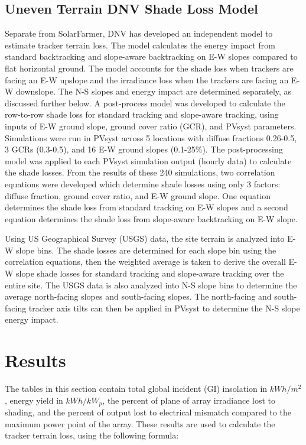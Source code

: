 \documentclass[conference]{IEEEtran}
\begin{document}
\subsection{Uneven Terrain DNV Shade Loss Model}
Separate from SolarFarmer, DNV has developed an independent model to estimate tracker terrain loss. The model calculates the energy impact from standard backtracking and slope-aware backtracking on E-W slopes compared to flat horizontal ground. The model accounts for the shade loss when trackers are facing an E-W upslope and the irradiance loss when the trackers are facing an E-W downslope. The N-S slopes and energy impact are determined separately, as discussed further below. A post-process model was developed to calculate the row-to-row shade loss for standard tracking and slope-aware tracking, using inputs of E-W ground slope, ground cover ratio (GCR), and PVsyst parameters. Simulations were run in PVsyst across 5 locations with diffuse fractions 0.26-0.5, 3 GCRs (0.3-0.5), and 16 E-W ground slopes (0.1-25\%). The post-processing model was applied to each PVsyst simulation output (hourly data) to calculate the shade losses. From the results of these 240 simulations, two correlation equations were developed which determine shade losses using only 3 factors: diffuse fraction, ground cover ratio, and E-W ground slope. One equation determines the shade loss from standard tracking on E-W slopes and a second equation determines the shade loss from slope-aware backtracking on E-W slope. 

Using US Geographical Survey (USGS) data, the site terrain is analyzed into E-W slope bins. The shade losses are determined for each slope bin using the correlation equations, then the weighted average is taken to derive the overall E-W slope shade losses for standard tracking and slope-aware tracking over the entire site. The USGS data is also analyzed into N-S slope bins to determine the average north-facing slopes and south-facing slopes. The north-facing and south-facing tracker axis tilts can then be applied in PVsyst to determine the N-S slope energy impact.


\section{Results}

The tables in this section contain total global incident (GI) insolation in $kWh/m^2$, energy yield in $kWh/kW_p$, the percent of plane of array irradiance lost to shading, and the percent of output lost to electrical mismatch compared to the maximum power point of the array. These results are used to calculate the tracker terrain loss, using the following formula:
\end{document}
